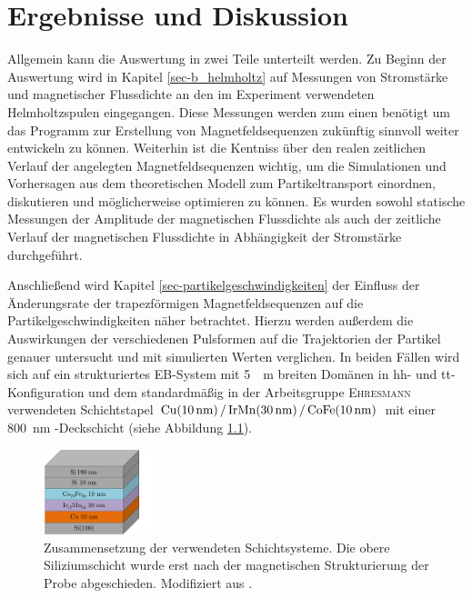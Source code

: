 \documentclass[page,pdftex,12pt,a4paper,twoside,openright]{scrbook}
\begin{document}
\chapter{Ergebnisse und Diskussion \label{sec-ergebnisse}}
\label{sec:orgf66f697}
Allgemein kann die Auswertung in zwei Teile unterteilt werden.
Zu Beginn der Auswertung wird in Kapitel \ref{sec-b_helmholtz} auf Messungen von Stromstärke und magnetischer Flussdichte an den im Experiment verwendeten Helmholtzspulen eingegangen. Diese Messungen werden zum einen benötigt um das Programm zur Erstellung von Magnetfeldsequenzen zukünftig sinnvoll weiter entwickeln zu können. Weiterhin ist die Kentniss über den realen zeitlichen Verlauf der angelegten Magnetfeldsequenzen wichtig, um die Simulationen und Vorhersagen aus dem theoretischen Modell zum Partikeltransport einordnen, diskutieren und möglicherweise optimieren zu können. Es wurden sowohl statische Messungen der Amplitude der magnetischen Flussdichte als auch der zeitliche Verlauf der magnetischen Flussdichte in Abhängigkeit der Stromstärke durchgeführt.

Anschließend wird Kapitel \ref{sec-partikelgeschwindigkeiten} der Einfluss der Änderungsrate der trapezförmigen Magnetfeldsequenzen auf die Partikelgeschwindigkeiten näher betrachtet. Hierzu werden außerdem die Auswirkungen der verschiedenen Pulsformen auf die Trajektorien der Partikel genauer untersucht und mit simulierten Werten verglichen. In beiden Fällen wird sich auf ein strukturiertes EB-System mit \SI{5}{\mu\meter} breiten Domänen in hh- und tt-Konfiguration und dem standardmäßig in der Arbeitsgruppe \textsc{Ehresmann} verwendeten Schichtstapel \(\ce{ Cu(\SI{10}{\nano\meter}) / IrMn(\SI{30}{\nano\meter}) / CoFe(\SI{10}{\nano\meter}) }\) mit einer \SI{800}{\nano\meter} -Deckschicht (siehe Abbildung \ref{fig-layer}).

\begin{figure}[h]
\centering
\includegraphics[width=0.3\textwidth]{img/layer.png}
\caption{\label{fig-layer}
Zusammensetzung der verwendeten Schichtsysteme. Die obere Siliziumschicht wurde erst nach der magnetischen Strukturierung der Probe abgeschieden. Modifiziert aus \cite{janzen_fernsteuerbarer_2018}.}
\end{figure}
\end{document}
